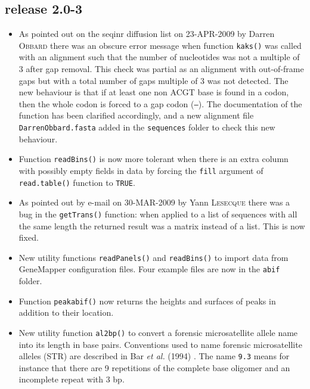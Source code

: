 \documentclass{article}
\begin{document}
\subsection*{release 2.0-3}

\begin{itemize}

\item As pointed out on the seqinr diffusion list on 23-APR-2009
by Darren \textsc{Obbard} there was an obscure error message when function
\texttt{kaks()} was called with an alignment such that the number
of nucleotides was not a multiple of 3 after gap removal. This check
was partial as an alignment with out-of-frame gaps but with
a total number of gaps multiple of 3 was not detected.
The new behaviour is that if at least one non ACGT base is found in a
codon, then the whole codon is forced to a gap codon (\texttt{---}).
The documentation of the function has been clarified accordingly,
and a new alignment file \texttt{DarrenObbard.fasta} added in
the \texttt{sequences} folder to check this new behaviour.

\item Function \texttt{readBins()} is now more tolerant when there
is an extra column with possibly empty fields in data by forcing
the \texttt{fill} argument of \texttt{read.table()} function to
\texttt{TRUE}.

\item As pointed out by e-mail on 30-MAR-2009 by Yann \textsc{Lesecque} there 
was a bug in the \texttt{getTrans()} function: when applied to a 
list of sequences with all the same length the returned result 
was a matrix instead of a list. This is now fixed.

\item New utility functions \texttt{readPanels()} and \texttt{readBins()} 
to import data from GeneMapper configuration files. Four example files
are now in the \texttt{abif} folder.

\item Function \texttt{peakabif()} now returns the heights and
surfaces of peaks in addition to their location.

\item New utility function \texttt{al2bp()} to convert
a forensic microsatellite allele name into its length in base pairs.
Conventions used to name forensic microsatellite alleles (STR) are described
in Bar \emph{et al.} (1994) \cite{BarW1994}. 
The name \texttt{9.3} means for instance that there are
9 repetitions of the complete base oligomer and an incomplete 
repeat with 3 bp.

\end{itemize}
\end{document}
